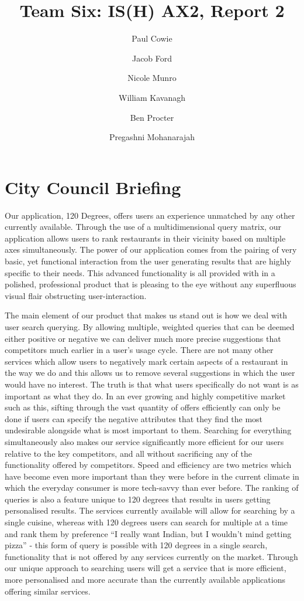 \documentclass[10pt,a4paper]{article}
\author{Paul Cowie \and Jacob Ford \and Nicole Munro \and William Kavanagh \and Ben Procter \and Pregashni Mohanarajah }
\date{}
\title{Team Six: IS(H) AX2, Report 2}
\begin{document}
\maketitle

\section*{City Council Briefing}

Our application, 120 Degrees, offers users an experience unmatched by any other currently available. Through the use of a multidimensional query matrix, our application allows users to rank restaurants in their vicinity based on multiple axes simultaneously. The power of our application comes from the pairing of very basic, yet functional interaction from the user generating results that are highly specific to their needs. This advanced functionality is all provided with in a polished, professional product that is pleasing to the eye without any superfluous visual flair obstructing user-interaction.

The main element of our product that makes us stand out is how we deal with user search querying. By allowing multiple, weighted queries that can be deemed either positive or negative we can deliver much more precise suggestions that competitors much earlier in a user’s usage cycle. There are not many other services which allow users to negatively mark certain aspects of a restaurant in the way we do and this allows us to remove several suggestions in which the user would have no interest. The truth is that what users specifically do not want is as important as what they do. In an ever growing and highly competitive market such as this, sifting through the vast quantity of offers efficiently can only be done if users can specify the negative attributes that they find the most undesirable alongside what is most important to them. Searching for everything simultaneously also makes our service significantly more efficient for our users relative to the key competitors, and all without sacrificing any of the functionality offered by competitors. Speed and efficiency are two metrics which have become even more important than they were before in the current climate in which the everyday consumer is more tech-savvy than ever before. The ranking of queries is also a feature unique to 120 degrees that results in users getting personalised results. The services currently available will allow for searching by a single cuisine, whereas with 120 degrees users can search for multiple at a time and rank them by preference “I really want Indian, but I wouldn’t mind getting pizza” - this form of query is possible with 120 degrees in a single search, functionality that is not offered by any services currently on the market. Through our unique approach to searching users will get a service that is more efficient, more personalised and more accurate than the currently available applications offering similar services.
\end{document}
